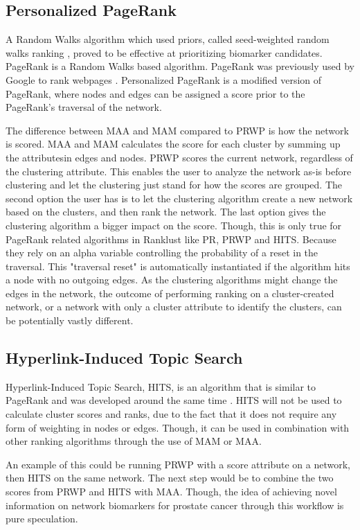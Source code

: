 \subsection{Personalized PageRank}
A Random Walks algorithm which used priors, called seed-weighted random walks
ranking \cite{sw-rwr}, proved to be effective at prioritizing biomarker
candidates. PageRank is a Random Walks based algorithm. PageRank was previously
used by Google to rank webpages \cite{pagerank}. Personalized PageRank is a
modified version of PageRank, where nodes and edges can be assigned a score
prior to the PageRank's traversal of the network. 

The difference between MAA and MAM compared to PRWP is how the network is
scored. MAA and MAM calculates the score for each cluster by summing up the
attributesin edges and nodes. PRWP scores the current network, regardless of the
clustering attribute. This enables the user to analyze the network as-is before
clustering and let the clustering just stand for how the scores are grouped. The
second option the user has is to let the clustering algorithm create a new
network based on the clusters, and then rank the network. The last option gives
the clustering algorithm a bigger impact on the score. Though, this is only true
for PageRank related algorithms in Ranklust like PR, PRWP and HITS. Because they
rely on an alpha variable controlling the probability of a reset in the
traversal. This "traversal reset" is automatically instantiated if the algorithm
hits a node with no outgoing edges. As the clustering algorithms might change
the edges in the network, the outcome of performing ranking on a cluster-created
network, or a network with only a cluster attribute to identify the clusters,
can be potentially vastly different. %

\subsection{Hyperlink-Induced Topic Search}
Hyperlink-Induced Topic Search, HITS, is an algorithm that is similar to
PageRank and was developed around the same time \cite{hits}\cite{hits-origin}.
HITS will not be used to calculate cluster scores and ranks, due to the fact
that it does not require any form of weighting in nodes or edges. Though, it can
be used in combination with other ranking algorithms through the use of MAM or
MAA. 

An example of this could be running PRWP with a score attribute on a
network, then HITS on the same network. The next step would be to combine the
two scores from PRWP and HITS with MAA. Though, the idea of achieving novel
information on network biomarkers for prostate cancer through this workflow is
pure speculation.


